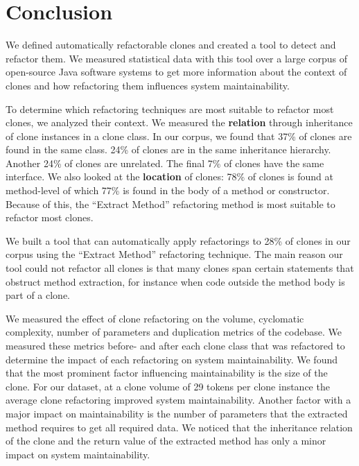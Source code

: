 \chapter{Conclusion} \label{ch:conclusion}
We defined automatically refactorable clones and created a tool to detect and refactor them. We measured statistical data with this tool over a large corpus of open-source Java software systems to get more information about the context of clones and how refactoring them influences system maintainability.


To determine which refactoring techniques are most suitable to refactor most clones, we analyzed their context. We measured the \textbf{relation} through inheritance of clone instances in a clone class. In our corpus, we found that 37\% of clones are found in the same class. 24\% of clones are in the same inheritance hierarchy. Another 24\% of clones are unrelated. The final 7\% of clones have the same interface. We also looked at the \textbf{location} of clones: 78\% of clones is found at method-level of which 77\% is found in the body of a method or constructor. Because of this, the ``Extract Method'' refactoring method is most suitable to refactor most clones.

We built a tool that can automatically apply refactorings to 28\% of clones in our corpus using the ``Extract Method'' refactoring technique. The main reason our tool could not refactor all clones is that many clones span certain statements that obstruct method extraction, for instance when code outside the method body is part of a clone.

We measured the effect of clone refactoring on the volume, cyclomatic complexity, number of parameters and duplication metrics of the codebase. We measured these metrics before- and after each clone class that was refactored to determine the impact of each refactoring on system maintainability. We found that the most prominent factor influencing maintainability is the size of the clone. For our dataset, at a clone volume of 29 tokens per clone instance the average clone refactoring improved system maintainability. Another factor with a major impact on maintainability is the number of parameters that the extracted method requires to get all required data. We noticed that the inheritance relation of the clone and the return value of the extracted method has only a minor impact on system maintainability.

